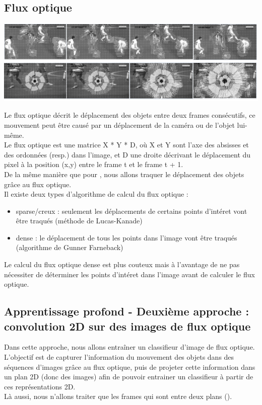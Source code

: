 \documentclass[11pt]{article}
\begin{document}
\subsection{Flux optique}
\label{sec:org27fc4d6}
\begin{center}
\includegraphics[width=.9\linewidth]{optical_flow_2.png}
\end{center}
Le flux optique décrit le déplacement des objets entre deux frames consécutifs, ce mouvement peut être causé par un déplacement de la caméra ou de l'objet lui-même.\\
Le flux optique est une matrice X * Y * D, où X et Y sont l'axe des absisses et des ordonnées (resp.) dans l'image, et D une droite décrivant le déplacement du pixel à la position (x,y) entre le frame t et le frame t + 1.\\

De la même manière que pour \cite{wang11_action}, nous allons traquer le déplacement des objets grâce au flux optique.\\
Il existe deux types d'algorithme de calcul du flux optique :\\
\begin{itemize}
\item sparse/creux : seulement les déplacements de certains points d'intéret vont être traqués (méthode de Lucas-Kanade)\\
\item dense : le déplacement de tous les points dans l'image vont être traqués (algorithme de Gunner Farneback)\\
\end{itemize}
Le calcul du flux optique dense est plus couteux mais à l'avantage de ne pas nécessiter de déterminer les points d'intéret dans l'image avant de calculer le flux optique.\\

\subsection{Apprentissage profond - Deuxième approche : convolution 2D sur des images de flux optique}
\label{sec:org6808116}
Dans cette approche, nous allons entraîner un classifieur d'image de flux optique.\\
L'objectif est de capturer l'information du mouvement des objets dans des séquences d'images grâce au flux optique, puis de projeter cette information dans un plan 2D (donc des images) afin de pouvoir entrainer un classifieur à partir de ces représentations 2D.\\
Là aussi, nous n'allons traiter que les frames qui sont entre deux plans (\cite{Abd_Almageed_2008}).\\
\end{document}

